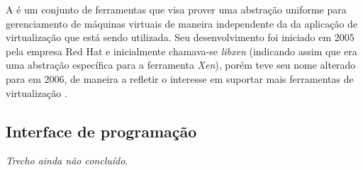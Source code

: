 A \libvirt{} é um conjunto de ferramentas que visa prover uma abstração
uniforme para gerenciamento de máquinas virtuais de maneira independente da
da aplicação de virtualização que está sendo utilizada. Seu desenvolvimento
foi iniciado em 2005 pela empresa Red Hat e inicialmente chamava-se
\emph{libxen} (indicando assim que era uma abstração específica para a
ferramenta \emph{Xen}), porém teve seu nome alterado para \libvirt{} em
2006, de maneira a refletir o interesse em suportar mais ferramentas de
virtualização .

\subsection{Interface de programação}\label{sec:libvirtapi}

\emph{Trecho ainda não concluído}.
